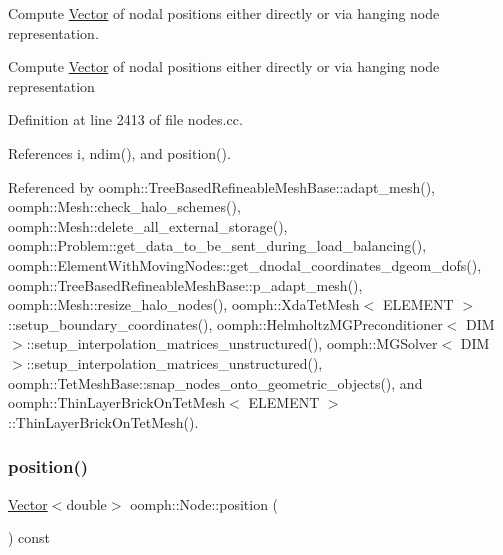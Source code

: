 Compute \hyperlink{classoomph_1_1Vector}{Vector} of nodal positions either directly or via hanging node representation. 

Compute \hyperlink{classoomph_1_1Vector}{Vector} of nodal positions either directly or via hanging node representation 

Definition at line 2413 of file nodes.\+cc.



References i, ndim(), and position().



Referenced by oomph\+::\+Tree\+Based\+Refineable\+Mesh\+Base\+::adapt\+\_\+mesh(), oomph\+::\+Mesh\+::check\+\_\+halo\+\_\+schemes(), oomph\+::\+Mesh\+::delete\+\_\+all\+\_\+external\+\_\+storage(), oomph\+::\+Problem\+::get\+\_\+data\+\_\+to\+\_\+be\+\_\+sent\+\_\+during\+\_\+load\+\_\+balancing(), oomph\+::\+Element\+With\+Moving\+Nodes\+::get\+\_\+dnodal\+\_\+coordinates\+\_\+dgeom\+\_\+dofs(), oomph\+::\+Tree\+Based\+Refineable\+Mesh\+Base\+::p\+\_\+adapt\+\_\+mesh(), oomph\+::\+Mesh\+::resize\+\_\+halo\+\_\+nodes(), oomph\+::\+Xda\+Tet\+Mesh$<$ E\+L\+E\+M\+E\+N\+T $>$\+::setup\+\_\+boundary\+\_\+coordinates(), oomph\+::\+Helmholtz\+M\+G\+Preconditioner$<$ D\+I\+M $>$\+::setup\+\_\+interpolation\+\_\+matrices\+\_\+unstructured(), oomph\+::\+M\+G\+Solver$<$ D\+I\+M $>$\+::setup\+\_\+interpolation\+\_\+matrices\+\_\+unstructured(), oomph\+::\+Tet\+Mesh\+Base\+::snap\+\_\+nodes\+\_\+onto\+\_\+geometric\+\_\+objects(), and oomph\+::\+Thin\+Layer\+Brick\+On\+Tet\+Mesh$<$ E\+L\+E\+M\+E\+N\+T $>$\+::\+Thin\+Layer\+Brick\+On\+Tet\+Mesh().

\mbox{\label{classoomph_1_1Node_ac82057a4f66ef4848ee4e61fad312ad7}} 
\subsubsection{\texorpdfstring{position()}{position()}\hspace{0.1cm}{\footnotesize\ttfamily [2/5]}}
{\footnotesize\ttfamily \hyperlink{classoomph_1_1Vector}{Vector}$<$double$>$ oomph\+::\+Node\+::position (\begin{DoxyParamCaption}{ }\end{DoxyParamCaption}) const\hspace{0.3cm}{\ttfamily [inline]}}



